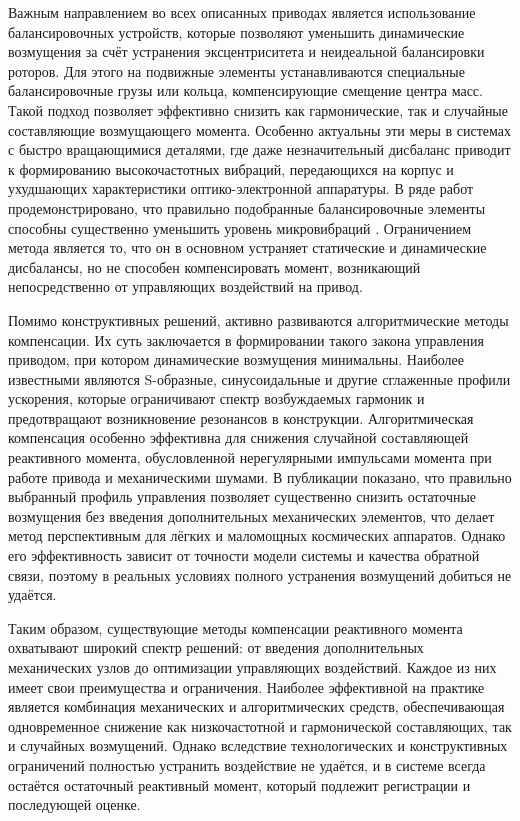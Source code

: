 Важным направлением во всех описанных приводах является использование балансировочных устройств, которые позволяют уменьшить динамические возмущения за счёт устранения эксцентриситета и неидеальной балансировки роторов. Для этого на подвижные элементы устанавливаются специальные балансировочные грузы или кольца, компенсирующие смещение центра масс. Такой подход позволяет эффективно снизить как гармонические, так и случайные составляющие возмущающего момента. Особенно актуальны эти меры в системах с быстро вращающимися деталями, где даже незначительный дисбаланс приводит к формированию высокочастотных вибраций, передающихся на корпус и ухудшающих характеристики оптико-электронной аппаратуры. В ряде работ продемонстрировано, что правильно подобранные балансировочные элементы способны существенно уменьшить уровень микровибраций \cite{liu2008reaction,alcorn2018fully}. Ограничением метода является то, что он в основном устраняет статические и динамические дисбалансы, но не способен компенсировать момент, возникающий непосредственно от управляющих воздействий на привод.

Помимо конструктивных решений, активно развиваются алгоритмические методы компенсации. Их суть заключается в формировании такого закона управления приводом, при котором динамические возмущения минимальны. Наиболее известными являются S-образные, синусоидальные и другие сглаженные профили ускорения, которые ограничивают спектр возбуждаемых гармоник и предотвращают возникновение резонансов в конструкции. Алгоритмическая компенсация особенно эффективна для снижения случайной составляющей реактивного момента, обусловленной нерегулярными импульсами момента при работе привода и механическими шумами. В публикации \cite{singer1990preshaping,singhose2009command} показано, что правильно выбранный профиль управления позволяет существенно снизить остаточные возмущения без введения дополнительных механических элементов, что делает метод перспективным для лёгких и маломощных космических аппаратов. Однако его эффективность зависит от точности модели системы и качества обратной связи, поэтому в реальных условиях полного устранения возмущений добиться не удаётся.

Таким образом, существующие методы компенсации реактивного момента охватывают широкий спектр решений: от введения дополнительных механических узлов до оптимизации управляющих воздействий. Каждое из них имеет свои преимущества и ограничения. Наиболее эффективной на практике является комбинация механических и алгоритмических средств, обеспечивающая одновременное снижение как низкочастотной и гармонической составляющих, так и случайных возмущений. Однако вследствие технологических и конструктивных ограничений полностью устранить воздействие не удаётся, и в системе всегда остаётся остаточный реактивный момент, который подлежит регистрации и последующей оценке.


